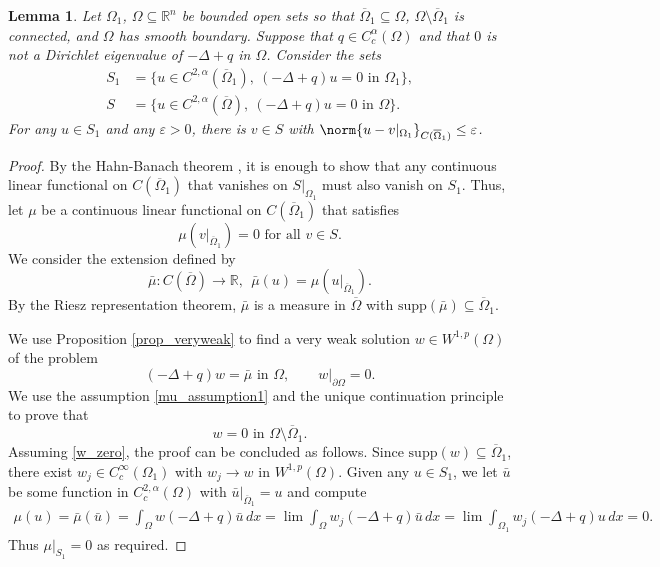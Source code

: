 \documentclass[11pt,a4paper]{amsart}
\newtheorem{Lemma}[Theorem]{Lemma}
\theoremstyle{definition}
\numberwithin{equation}{section}
\newcommand{\mR}{\mathbb{R}}                    %
\newcommand{\ol}[1]{\overline{#1}}
\newcommand{\p}{\partial}
\newcommand{\Om}{\Omega}
\begin{document}
\begin{Lemma} \label{lemma_runge}
Let $\Omega_1$, $\Omega \subseteq \mR^n$ be bounded open sets so that $\ol{\Om}_1 \subseteq \Om$, $\Om \setminus \ol{\Om}_1$ is connected, and $\Om$ has smooth boundary. Suppose that $q \in C^{\alpha}_c(\Om)$ and that $0$ is not a Dirichlet eigenvalue of $-\Delta+q$ in $\Om$. Consider the sets 
\begin{align*}
S_1 &= \{ u \in C^{2,\alpha}(\ol{\Om}_1), \ (-\Delta+q)u =0 \text{ in $\Om_1$} \}, \\
S &= \{ u \in C^{2,\alpha}(\ol{\Om}), \ (-\Delta+q)u =0 \text{ in $\Om$} \}.
\end{align*}
For any $u \in S_1$ and any $\varepsilon > 0$, there is $v \in S$ with $\norm{u-v|_{\Om_1}}_{C(\ol{\Om}_1)} \leq \varepsilon$.
\end{Lemma}
\begin{proof}
By the Hahn-Banach theorem \cite[Corollary 3.15]{conway}, it is enough to show that any continuous linear functional on $C(\ol{\Om}_1)$ that vanishes on $S|_{\Om_1}$ must also vanish on $S_1$. Thus, let $\mu$ be a continuous linear functional on $C(\ol{\Om}_1)$ that satisfies 
\begin{equation} \label{mu_assumption1}
\mu(v|_{\ol{\Om}_1}) = 0 \text{ for all $v \in S$.}
\end{equation}
We consider the extension defined by 
\[
\bar{\mu}: C(\ol{\Om}) \to \mR, \ \ \bar{\mu}(u) = \mu(u|_{\ol{\Om}_1}).
\]
By the Riesz representation theorem, $\bar{\mu}$ is a measure in $\ol{\Om}$ with $\mathrm{supp}(\bar{\mu}) \subseteq \ol{\Om}_1$.

We use Proposition \ref{prop_veryweak} to find a very weak solution $w \in W^{1,p}(\Om)$ of the problem  
\begin{equation} \label{w_mubar_eq}
(-\Delta+q)w = \bar{\mu} \text{ in $\Om$}, \qquad w|_{\p \Om} = 0.
\end{equation}
We use the assumption \eqref{mu_assumption1} and the unique continuation principle to prove that 
\begin{equation} \label{w_zero}
\text{$w=0$ in $\Om \setminus \ol{\Om}_1$.}
\end{equation}
Assuming \eqref{w_zero}, the proof can be concluded as follows. Since $\mathrm{supp}(w) \subseteq \ol{\Om}_1$, there exist $w_j \in C^{\infty}_c(\Om_1)$ with $w_j \to w$ in $W^{1,p}(\Om)$. Given any $u \in S_1$, we let $\bar{u}$ be some function in $C^{2,\alpha}_c(\Om)$ with $\bar{u}|_{\ol{\Om}_1} = u$ and compute 
\begin{align*}
\mu(u) = \bar{\mu}(\bar{u}) = \int_{\Om} w(-\Delta+q)\bar{u} \,dx = \lim \int_{\Om} w_j(-\Delta+q)\bar{u} \,dx = \lim \int_{\Om_1} w_j(-\Delta+q)u \,dx = 0.
\end{align*}
Thus $\mu|_{S_1} = 0$ as required.


\end{proof}
\end{document}
